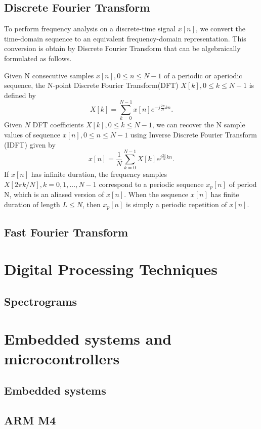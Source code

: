 \documentclass[twoside]{ctuthesis}
\theoremstyle{plain}
\theoremstyle{definition}
\theoremstyle{note}
\begin{document}
\subsection{Discrete Fourier Transform}
To perform frequency analysis on a discrete-time signal ${x[n]}$, we convert the time-domain sequence to an equivalent frequency-domain representation. This conversion is obtain by Discrete Fourier Transform that can be algebraically formulated as follows.\cite{cite:2,cite:3}
	
Given N consecutive samples $x[n], 0 \leq n \leq N-1$ of a periodic or aperiodic sequence, the N-point Discrete Fourier Transform(DFT) $X[k], 0 \leq k \leq N-1$ is defined by
\begin{equation} \label{eq:DFT}
X[k]=\sum_{k=0}^{N-1}x[n]e^{-j \frac{2 \pi}{N} kn}.
\end{equation}
Given $N$ DFT coefficients $X[k], 0 \leq k \leq N-1$, we can recover the N sample values of sequence $x[n], 0 \leq n \leq N-1$ using Inverse Discrete Fourier Transform (IDFT) given by
\begin{equation} \label{eq:IDFT}
x[n]=\frac{1}{N} \sum_{k=0}^{N-1}X[k]e^{j \frac{2 \pi}{N} kn}.
\end{equation}
If $x[n]$ has infinite duration, the frequency samples  $X[2 \pi k/ N], k=0, 1, ..., N-1$ correspond to a periodic sequence $x_{p}[n]$ of period N, which is an aliased version of $x[n]$. When the sequence $x[n]$ has finite duration of length $L \leq N$, then  $x_{p}[n]$ is simply a periodic repetition of $x[n]$.
\subsection{Fast Fourier Transform}
\section{Digital Processing Techniques}
\subsection{Spectrograms}
\section{Embedded systems and microcontrollers}
\subsection{Embedded systems}
\subsection{ARM M4}
\end{document}
